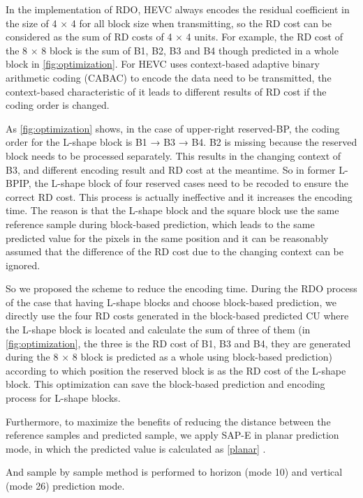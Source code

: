 \documentclass[journal]{IEEEtran}
\begin{document}
In the implementation of RDO, HEVC always encodes the residual coefficient in the size of 4 × 4 for all block size when transmitting, so the RD cost can be considered as the sum of RD costs of 4 × 4 units. For example, the RD cost of the 8 × 8 block is the sum of B1, B2, B3 and B4 though predicted in a whole block in \autoref{fig:optimization}. For HEVC uses context-based adaptive binary arithmetic coding (CABAC) to encode the data need to be transmitted, the context-based characteristic of it leads to different results of RD cost if the coding order is changed.

As \autoref{fig:optimization} shows, in the case of upper-right reserved-BP, the coding order for the L-shape block is B1 → B3 → B4. B2 is missing because the reserved block needs to be processed separately. This results in the changing context of B3, and different encoding result and RD cost at the meantime. So in former L-BPIP, the L-shape block of four reserved cases need to be recoded to ensure the correct RD cost. This process is actually ineffective and it increases the encoding time. The reason is that the L-shape block and the square block use the same reference sample during block-based prediction, which leads to the same predicted value for the pixels in the same position and it can be reasonably assumed that the difference of the RD cost due to the changing context can be ignored.

So we proposed the scheme to reduce the encoding time. During the RDO process of the case that having L-shape blocks and choose block-based prediction, we directly use the four RD costs generated in the block-based predicted CU where the L-shape block is located and calculate the sum of three of them (in \autoref{fig:optimization}, the three is the RD cost of B1, B3 and B4, they are generated during the 8 × 8 block is predicted as a whole using block-based prediction) according to which position the reserved block is as the RD cost of the L-shape block. This optimization can save the block-based prediction and encoding process for L-shape blocks.

Furthermore, to maximize the benefits of reducing the distance between the reference samples and predicted sample, we apply SAP-E \cite{12} in planar prediction mode, in which the predicted value is calculated as \eqref{planar} \cite{29}.

And sample by sample method is performed to horizon (mode 10) and vertical (mode 26) prediction mode.
\end{document}
